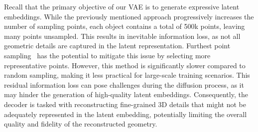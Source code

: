 
Recall that the primary objective of our VAE is to generate expressive latent embeddings. While the previously mentioned approach progressively increases the number of sampling points, each object contains a total of 500k points, leaving many points unsampled. This results in inevitable information loss, as not all geometric details are captured in the latent representation.
Furthest point sampling~\cite{qi2017pointnet++} has the potential to mitigate this issue by selecting more representative points. However, this method is significantly slower compared to random sampling, making it less practical for large-scale training scenarios. This residual information loss can pose challenges during the diffusion process, as it may hinder the generation of high-quality latent embeddings. Consequently, the decoder is tasked with reconstructing fine-grained 3D details that might not be adequately represented in the latent embedding, potentially limiting the overall quality and fidelity of the reconstructed geometry.


